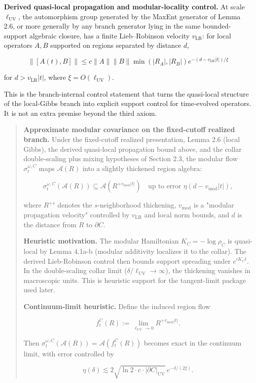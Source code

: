 \textbf{Derived quasi-local propagation and modular-locality control.} At scale \(\ell_{\mathrm{UV}}\), the automorphism group generated by the MaxEnt generator of Lemma 2.6, or more generally by any branch generator lying in the same bounded-support algebraic closure, has a finite Lieb--Robinson velocity \(v_{\mathrm{LR}}\): for local operators \(A, B\) supported on regions separated by distance \(d\),

\[
\|[A(t), B]\| \le c \|A\| \|B\| \min(|R_A|, |R_B|) e^{-(d - v_{\mathrm{LR}}|t|)/\xi}
\]

for \(d > v_{\mathrm{LR}}|t|\), where \(\xi = O(\ell_{\mathrm{UV}})\).

This is the branch-internal control statement that turns the quasi-local structure of the
local-Gibbs branch into explicit support control for time-evolved operators. It is not an extra
premise beyond the third axiom.

\begin{quote}
\textbf{Approximate modular covariance on the fixed-cutoff realized branch.} Under the fixed-cutoff realized presentation, Lemma 2.6 (local Gibbs), the derived quasi-local propagation bound above, and the collar double-scaling plus mixing hypotheses of Section 2.3, the modular flow \(\sigma_t^{\omega,C}\) maps \(\mathcal{A}(R)\) into a slightly thickened region algebra:

\[
\sigma_t^{\omega,C}(\mathcal{A}(R)) \subseteq \mathcal{A}(R^{+v_{\mathrm{mod}}|t|})
\quad \text{up to error } \eta(d - v_{\mathrm{mod}}|t|),
\]

where \(R^{+s}\) denotes the \(s\)-neighborhood thickening, \(v_{\mathrm{mod}}\) is a "modular propagation velocity" controlled by \(v_{\mathrm{LR}}\) and local norm bounds, and \(d\) is the distance from \(R\) to \(\partial C\).

\textbf{Heuristic motivation.} The modular Hamiltonian \(K_C = -\log \rho_C\) is quasi-local by Lemma 4.1a-b (modular additivity localizes it to the collar). The derived Lieb-Robinson control then bounds support spreading under \(e^{iK_C t}\). In the double-scaling collar limit (\(\delta/\ell_{\mathrm{UV}} \to \infty\)), the thickening vanishes in macroscopic units. This is heuristic support for the tangent-limit package used later.

\textbf{Continuum-limit heuristic.} Define the induced region flow

\[
f_t^C(R) := \lim_{\ell_{\mathrm{UV}} \to 0} R^{+v_{\mathrm{mod}}|t|}.
\]

Then \(\sigma_t^{\omega,C}(\mathcal{A}(R)) = \mathcal{A}(f_t^C(R))\) becomes exact in the continuum limit, with error controlled by

\[
\eta(\delta) \lesssim 2\sqrt{\ln 2 \cdot c \cdot |\partial C|_{\mathrm{UV}}} \, e^{-\delta/(2\xi)}.
\]
\end{quote}

